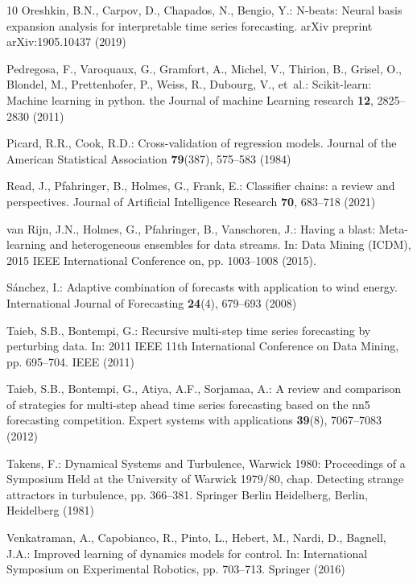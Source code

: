 \documentclass[smallcondensed]{svjour3}
\begin{document}
\begin{thebibliography}{10}
Oreshkin, B.N., Carpov, D., Chapados, N., Bengio, Y.: N-beats: Neural basis
  expansion analysis for interpretable time series forecasting.
\newblock arXiv preprint arXiv:1905.10437  (2019)

Pedregosa, F., Varoquaux, G., Gramfort, A., Michel, V., Thirion, B., Grisel,
  O., Blondel, M., Prettenhofer, P., Weiss, R., Dubourg, V., et~al.:
  Scikit-learn: Machine learning in python.
\newblock the Journal of machine Learning research \textbf{12}, 2825--2830
  (2011)

Picard, R.R., Cook, R.D.: Cross-validation of regression models.
\newblock Journal of the American Statistical Association \textbf{79}(387),
  575--583 (1984)

Read, J., Pfahringer, B., Holmes, G., Frank, E.: Classifier chains: a review
  and perspectives.
\newblock Journal of Artificial Intelligence Research \textbf{70}, 683--718
  (2021)

van Rijn, J.N., Holmes, G., Pfahringer, B., Vanschoren, J.: Having a blast:
  Meta-learning and heterogeneous ensembles for data streams.
\newblock In: Data Mining (ICDM), 2015 IEEE International Conference on, pp.
  1003--1008 (2015).
\newblock {}

S{\'a}nchez, I.: Adaptive combination of forecasts with application to wind
  energy.
\newblock International Journal of Forecasting \textbf{24}(4), 679--693 (2008)

Taieb, S.B., Bontempi, G.: Recursive multi-step time series forecasting by
  perturbing data.
\newblock In: 2011 IEEE 11th International Conference on Data Mining, pp.
  695--704. IEEE (2011)

Taieb, S.B., Bontempi, G., Atiya, A.F., Sorjamaa, A.: A review and comparison
  of strategies for multi-step ahead time series forecasting based on the nn5
  forecasting competition.
\newblock Expert systems with applications \textbf{39}(8), 7067--7083 (2012)

Takens, F.: Dynamical Systems and Turbulence, Warwick 1980: Proceedings of a
  Symposium Held at the University of Warwick 1979/80, chap. Detecting strange
  attractors in turbulence, pp. 366--381.
\newblock Springer Berlin Heidelberg, Berlin, Heidelberg (1981)

Venkatraman, A., Capobianco, R., Pinto, L., Hebert, M., Nardi, D., Bagnell,
  J.A.: Improved learning of dynamics models for control.
\newblock In: International Symposium on Experimental Robotics, pp. 703--713.
  Springer (2016)


\end{thebibliography}
\end{document}
